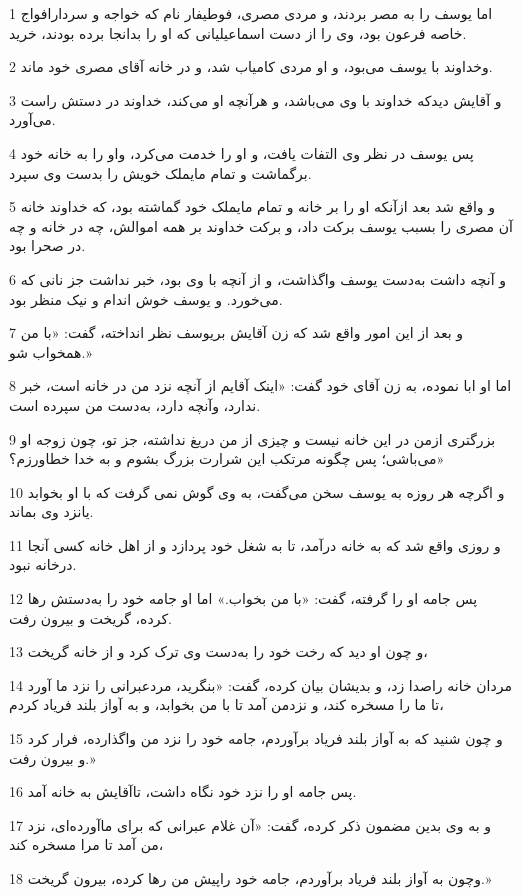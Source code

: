 \par 1 اما یوسف را به مصر بردند، و مردی مصری، فوطیفار نام که خواجه و سردارافواج خاصه فرعون بود، وی را از دست اسماعیلیانی که او را بدانجا برده بودند، خرید.
\par 2 وخداوند با یوسف می‌بود، و او مردی کامیاب شد، و در خانه آقای مصری خود ماند.
\par 3 و آقایش دیدکه خداوند با وی می‌باشد، و هر‌آنچه او می‌کند، خداوند در دستش راست می‌آورد.
\par 4 پس یوسف در نظر وی التفات یافت، و او را خدمت می‌کرد، واو را به خانه خود برگماشت و تمام مایملک خویش را بدست وی سپرد.
\par 5 و واقع شد بعد ازآنکه او را بر خانه و تمام مایملک خود گماشته بود، که خداوند خانه آن مصری را بسبب یوسف برکت داد، و برکت خداوند بر همه اموالش، چه در خانه و چه در صحرا بود.
\par 6 و آنچه داشت به‌دست یوسف واگذاشت، و از آنچه با وی بود، خبر نداشت جز نانی که می‌خورد. و یوسف خوش اندام و نیک منظر بود.
\par 7 و بعد از این امور واقع شد که زن آقایش بریوسف نظر انداخته، گفت: «با من همخواب شو.»
\par 8 اما او ابا نموده، به زن آقای خود گفت: «اینک آقایم از آنچه نزد من در خانه است، خبر ندارد، وآنچه دارد، به‌دست من سپرده است.
\par 9 بزرگتری ازمن در این خانه نیست و چیزی از من دریغ نداشته، جز تو، چون زوجه او می‌باشی؛ پس چگونه مرتکب این شرارت بزرگ بشوم و به خدا خطاورزم؟»
\par 10 و اگرچه هر روزه به یوسف سخن می‌گفت، به وی گوش نمی گرفت که با او بخوابد یانزد وی بماند.
\par 11 و روزی واقع شد که به خانه درآمد، تا به شغل خود پردازد و از اهل خانه کسی آنجا درخانه نبود.
\par 12 پس جامه او را گرفته، گفت: «با من بخواب.» اما او جامه خود را به‌دستش رها کرده، گریخت و بیرون رفت.
\par 13 و چون او دید که رخت خود را به‌دست وی ترک کرد و از خانه گریخت،
\par 14 مردان خانه راصدا زد، و بدیشان بیان کرده، گفت: «بنگرید، مردعبرانی را نزد ما آورد تا ما را مسخره کند، و نزدمن آمد تا با من بخوابد، و به آواز بلند فریاد کردم،
\par 15 و چون شنید که به آواز بلند فریاد برآوردم، جامه خود را نزد من واگذارده، فرار کرد و بیرون رفت.»
\par 16 پس جامه او را نزد خود نگاه داشت، تاآقایش به خانه آمد.
\par 17 و به وی بدین مضمون ذکر کرده، گفت: «آن غلام عبرانی که برای ماآورده‌ای، نزد من آمد تا مرا مسخره کند،
\par 18 وچون به آواز بلند فریاد برآوردم، جامه خود راپیش من رها کرده، بیرون گریخت.»
